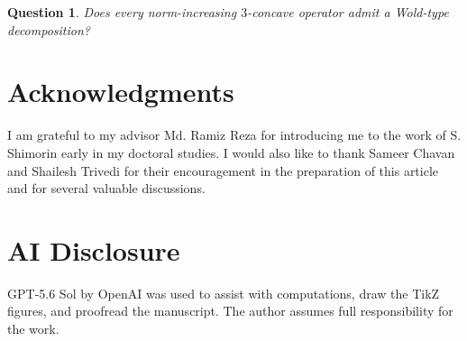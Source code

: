 \documentclass[11pt, reqno, a4paper]{amsart}
\newtheorem{question}[theorem]{Question}
\theoremstyle{definition}
\numberwithin{equation}{section}
\begin{document}
    \begin{question}
        Does every norm-increasing $3$-concave operator admit a Wold-type decomposition?
    \end{question}

\section*{Acknowledgments}
I am grateful to my advisor Md. Ramiz Reza for introducing me to the work of S. Shimorin \cite{zbMATH01572594} early in my doctoral studies. I would also like to thank Sameer Chavan and Shailesh Trivedi for their encouragement in the preparation of this article and for several valuable discussions.

\section*{AI Disclosure}
GPT-5.6 Sol by OpenAI was used to assist with computations, draw the TikZ figures, and proofread the manuscript. The author assumes full responsibility for the work.




\end{document}
